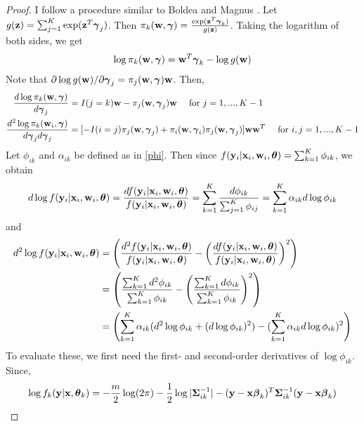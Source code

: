 \begin{proof}
I follow a procedure similar to Boldea and Magnus \cite{boldea2009}. Let $g(\mathbf  z)=\sum_{j=1}^{K}\exp(\mathbf  z^{T}\boldsymbol \gamma_{j})$. Then $\pi_{k}(\mathbf w,\boldsymbol\gamma)=\frac{\exp( \mathbf  z^{T}\boldsymbol\gamma_{k})}{g(\mathbf  z)}$. Taking the logarithm of both sides, we get
\begin{align}
\log \pi_{k}(\mathbf w,\boldsymbol\gamma)=\mathbf w^{T}\boldsymbol\gamma_{k} - \log g(\mathbf w)
\label{wts}
\end{align}
Note that $\partial\log g(\mathbf w)/\partial \boldsymbol \gamma_{j}=\pi_{j}(\mathbf w,\boldsymbol\gamma) \mathbf w$. Then,
\begin{align}
\frac{d\log\pi_{k}(\mathbf w,\boldsymbol\gamma)}{d\boldsymbol\gamma_{j}}&=I(j=k)\mathbf w-\pi_{j}(\mathbf w,\boldsymbol\gamma_{j})\mathbf w\quad\text{ for }j=1,...,K-1\nonumber\\
\frac{d^{2}\log\pi_{k}(\mathbf w_{i},\boldsymbol\gamma)}{d\boldsymbol\gamma_{j}d\boldsymbol\gamma_{j}}&=[-I(i=j)\pi_{j}(\mathbf w,\boldsymbol\gamma_{j})+\pi_{i}(\mathbf w,\boldsymbol\gamma_{i})\pi_{j}(\mathbf w,\boldsymbol\gamma_{j})]\mathbf w\mathbf w^{T}\quad\text{ for }i,j=1,...,K-1
\label{logpi}
\end{align}
Let $\phi_{ik}$ and $\alpha_{ik}$ be defined as in \eqref{phi}. Then since $f(\mathbf y_{i}|\mathbf x_{i},\mathbf w_{i},\boldsymbol\theta)=\sum^{K}_{k=1}\phi_{ik}$, we obtain
\begin{align}
d\log f(\mathbf y_{i}|\mathbf x_{i},\mathbf w_{i},\boldsymbol\theta)=\frac{d f(\mathbf y_{i}|\mathbf x_{i},\mathbf w_{i},\boldsymbol\theta)}{f(\mathbf y_{i}|\mathbf x_{i},\mathbf w_{i},\boldsymbol\theta)}=\sum^{K}_{k=1}\frac{d\phi_{ik}}{\sum^{K}_{j=1}\phi_{ij}}=\sum^{K}_{k=1}\alpha_{ik}d\log \phi_{ik}\label{dlogf}
\end{align}
and 
\begin{align}\label{d2logf}
d^{2}\log f(\mathbf y_{i}|\mathbf x_{i},\mathbf w_{i},\boldsymbol\theta)&=\left(\frac{d^{2} f(\mathbf y_{i}|\mathbf x_{i},\mathbf w_{i},\boldsymbol\theta)}{f(\mathbf y_{i}|\mathbf x_{i},\mathbf w_{i},\boldsymbol\theta)}-\left(\frac{d f(\mathbf y_{i}|\mathbf x_{i},\mathbf w_{i},\boldsymbol\theta)}{f(\mathbf y_{i}|\mathbf x_{i},\mathbf w_{i},\boldsymbol\theta)}\right)^{2}\right)\nonumber\\
&=\left(\frac{\sum^{K}_{k=1}d^{2}\phi_{ik}}{\sum^{K}_{k=1}\phi_{ik}}-\left(\frac{\sum^{K}_{k=1}d \phi_{ik}}{\sum^{K}_{k=1}\phi_{ik}}\right)^{2}\right)\nonumber\\
&=\left(\sum^{K}_{k=1}\alpha_{ik}(d^{2}\log \phi_{ik}+(d\log \phi_{ik})^{2})-(\sum^{K}_{k=1}\alpha_{ik}d\log \phi_{ik})^{2}\right)
\end{align}
To evaluate these, we first need the first- and second-order derivatives of $\log \phi_{ik}$.  Since, 
\begin{align*}
\log f_{k}(\B y|\B x,\BS\theta_{k})=-\frac{m}{2}\log(2\pi)-\frac{1}{2}\log |\BS\Sigma_{ik}^{-1}|-(\B y-\B x\BS \beta_{k})^{T}\BS\Sigma_{ik}^{-1}(\B y-\B x\BS\beta_{k})

\end{align*}
\end{proof}
